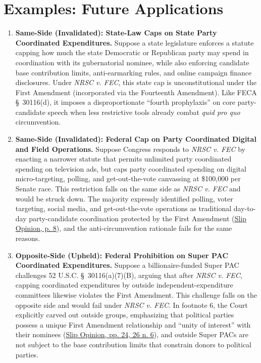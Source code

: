 \documentclass[12pt]{article}
\begin{document}
\section{Examples: Future Applications}
\begin{enumerate}
\item \textbf{Same-Side (Invalidated): State-Law Caps on State Party Coordinated Expenditures.} Suppose a state legislature enforces a statute capping how much the state Democratic or Republican party may spend in coordination with its gubernatorial nominee, while also enforcing candidate base contribution limits, anti-earmarking rules, and online campaign finance disclosures. Under \textit{NRSC v. FEC}, this state cap is unconstitutional under the First Amendment (incorporated via the Fourteenth Amendment). Like FECA \S~30116(d), it imposes a disproportionate ``fourth prophylaxis'' on core party-candidate speech when less restrictive tools already combat \textit{quid pro quo} circumvention.

\item \textbf{Same-Side (Invalidated): Federal Cap on Party Coordinated Digital and Field Operations.} Suppose Congress responds to \textit{NRSC v. FEC} by enacting a narrower statute that permits unlimited party coordinated spending on television ads, but caps party coordinated spending on digital micro-targeting, polling, and get-out-the-vote canvassing at \$100,000 per Senate race. This restriction falls on the same side as \textit{NRSC v. FEC} and would be struck down. The majority expressly identified polling, voter targeting, social media, and get-out-the-vote operations as traditional day-to-day party-candidate coordination protected by the First Amendment (\href{https://www.supremecourt.gov/opinions/25pdf/24-621_h315.pdf}{Slip Opinion, p. 8}), and the anti-circumvention rationale fails for the same reasons.

\item \textbf{Opposite-Side (Upheld): Federal Prohibition on Super PAC Coordinated Expenditures.} Suppose a billionaire-funded Super PAC challenges 52 U.S.C. \S~30116(a)(7)(B), arguing that after \textit{NRSC v. FEC}, capping coordinated expenditures by outside independent-expenditure committees likewise violates the First Amendment. This challenge falls on the opposite side and would fail under \textit{NRSC v. FEC}. In footnote 6, the Court explicitly carved out outside groups, emphasizing that political parties possess a unique First Amendment relationship and ``unity of interest'' with their nominees (\href{https://www.supremecourt.gov/opinions/25pdf/24-621_h315.pdf}{Slip Opinion, pp. 24, 26 n. 6}), and outside Super PACs are not subject to the base contribution limits that constrain donors to political parties.


\end{enumerate}
\end{document}
